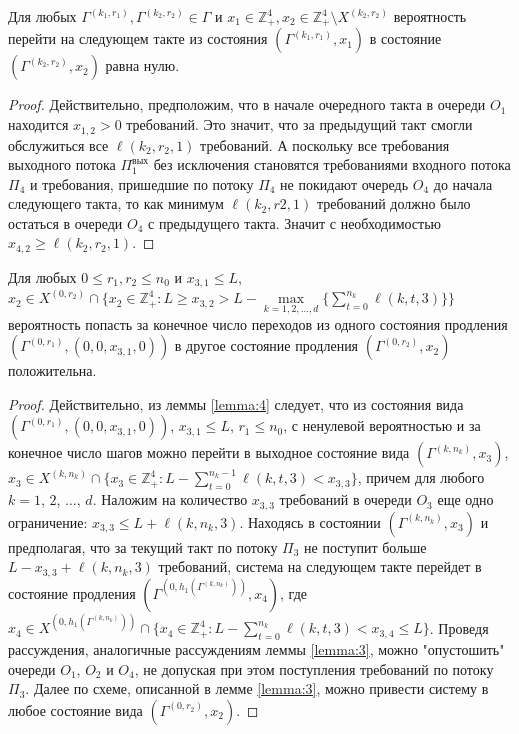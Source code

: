 \documentclass[a4paper,12pt,russian]{extarticle}
\begin{document}
\begin{lemma}
Для любых $\Gamma^{(k_1,r_1)}, \Gamma^{(k_2,r_2)} \in \Gamma$ и $x_1 \in \mathbb{Z}_+^4, x_2 \in \mathbb{Z}_+^4 \setminus X^{(k_2,r_2)}$ вероятность перейти на следующем такте из состояния $(\Gamma^{(k_1,r_1)},x_1)$ в состояние $(\Gamma^{(k_2,r_2)}, x_2)$ равна нулю.
\label{lemma:5}
\end{lemma}
\begin{proof}
Действительно, предположим, что в начале очередного такта в очереди $O_1$ находится $x_{1,2} > 0$ требований. Это значит, что за предыдущий такт смогли обслужиться все $\ell(k_2,r_2,1)$ требований. А поскольку все требования выходного потока $\Pi_1^{\mathrm{\text{вых}}}$ без исключения становятся требованиями входного потока $\Pi_4$ и требования, пришедшие по потоку $\Pi_4$ не покидают очередь $O_4$ до начала следующего такта, то как минимум $\ell(k_2,r2,1)$ требований должно было остаться в очереди $O_4$ с предыдущего такта. Значит с необходимостью $x_{4,2} \geqslant \ell(k_2,r_2,1)$.
\end{proof}

\begin{lemma}
Для любых $0 \leqslant r_1, r_2 \leqslant n_0$ и $x_{3,1}\leqslant L$, $x_2 \in X^{(0,r_2)}\cap \{x_2 \in \mathbb{Z}_+^4 \colon L \geqslant x_{3,2} > L - \max\limits_{k=1, 2, \ldots, d}\{\sum_{t=0}^{n_k} \ell(k,t,3)\}\}$ вероятность попасть за конечное число переходов из одного состояния продления $(\Gamma^{(0,r_1)},(0,0,x_{3,1},0))$ в другое состояние продления $(\Gamma^{(0,r_2)},x_2)$ положительна.
\label{lemma:6}
\end{lemma}
\begin{proof}
Действительно, из леммы \eqref{lemma:4} следует, что из состояния вида $(\Gamma^{(0,r_1)},(0,0,x_{3,1},0))$, $x_{3,1}\leqslant L$, $r_1 \leqslant n_0$, с ненулевой вероятностью и за конечное число шагов можно перейти в выходное состояние вида $(\Gamma^{(k,n_k)},x_3)$, $x_3 \in X^{(k,n_k)}\cap \{x_3 \in \mathbb{Z}_+^4 \colon   L - \sum_{t=0}^{n_k-1} \ell(k,t,3) < x_{3,3}\}$, причем для любого $k=1$, $2$, $\ldots$, $d$. Наложим на количество $x_{3,3}$ требований в очереди $O_3$ еще одно ограничение: $x_{3,3} \leqslant L + \ell(k,n_k,3)$. Находясь в состоянии $(\Gamma^{(k,n_k)},x_3)$ и предполагая, что за текущий такт по потоку $\Pi_3$ не поступит больше $L - x_{3,3} + \ell(k,n_k,3)$ требований, система на следующем такте перейдет в состояние продления $(\Gamma^{(0,h_1(\Gamma^{(k,n_k)}))}, x_4)$, где $x_4 \in X^{(0,h_1(\Gamma^{(k,n_k)}))}\cap \{x_4 \in \mathbb{Z}_+^4 \colon  L - \sum_{t=0}^{n_k} \ell(k,t,3) < x_{3,4} \leqslant L\}$. Проведя рассуждения, аналогичные рассуждениям леммы \ref{lemma:3}, можно "опустошить" очереди $O_1$, $O_2$ и $O_4$, не допуская при этом поступления требований по потоку $\Pi_3$. Далее по схеме, описанной в лемме \ref{lemma:3}, можно привести систему в любое состояние вида $(\Gamma^{(0,r_2)}, x_2)$.
\end{proof}
\end{document}
